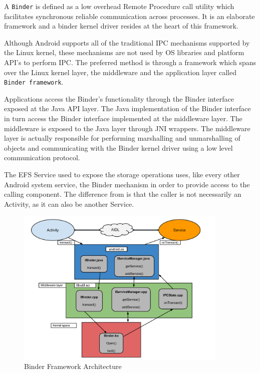 A \texttt{Binder} is defined as a low overhead Remote Procedure call utility which facilitates synchronous reliable communication across processes. It is an elaborate framework and a binder kernel driver resides at the heart of this framework.

Although Android supports all of the traditional IPC mechanisms supported by the Linux kernel, these mechanisms are not used by OS libraries and platform API's to perform IPC. The preferred method is through a framework which spans over the Linux kernel layer, the middleware and the application layer called \texttt{Binder framework}.

Applications access the Binder’s functionality through the Binder interface exposed at the Java API layer. The Java implementation of the Binder interface in turn access the Binder interface implemented at the middleware layer. The middleware is exposed to the Java layer through JNI wrappers. The middleware layer is actually responsible for performing marshalling and unmarshalling of objects and communicating with the Binder kernel driver using a low level communication protocol.

The EFS Service used to expose the storage operations uses, like every other Android system service, the Binder mechanism in order to provide access to the calling component. The difference from  is that the caller is not necessarily an Activity, as it can also be another Service.

\begin{figure}[h!]
\centering
    \includegraphics[width=0.9\textwidth]{src/img/binder/binderarch.pdf}
\caption{Binder Framework Architecture\cite{binder}}
\label{fig:bind-arch-multi-user}
\end{figure}

